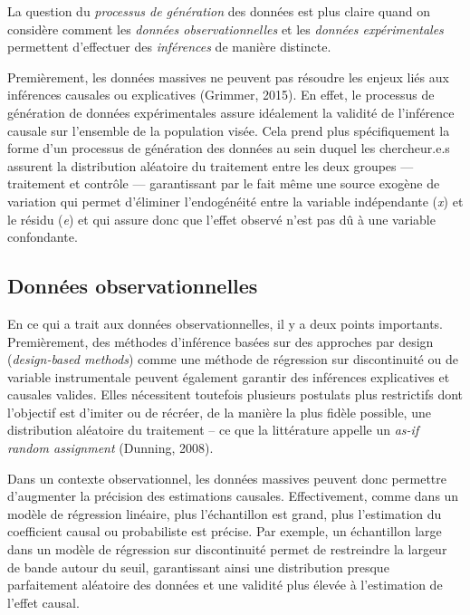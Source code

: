\documentclass[
  letterpaper,
]{scrbook}
\begin{document}
La question du \emph{processus de génération} des données est plus
claire quand on considère comment les \emph{données observationnelles}
et les \emph{données expérimentales} permettent d'effectuer des
\emph{inférences} de manière distincte.

Premièrement, les données massives ne peuvent pas résoudre les enjeux
liés aux inférences causales ou explicatives (Grimmer, 2015). En effet,
le processus de génération de données expérimentales assure idéalement
la validité de l'inférence causale sur l'ensemble de la population
visée. Cela prend plus spécifiquement la forme d'un processus de
génération des données au sein duquel les chercheur.e.s assurent la
distribution aléatoire du traitement entre les deux groupes ---
traitement et contrôle --- garantissant par le fait même une source
exogène de variation qui permet d'éliminer l'endogénéité entre la
variable indépendante (\emph{x}) et le résidu (\emph{e}) et qui assure
donc que l'effet observé n'est pas dû à une variable confondante.

\hypertarget{donnuxe9es-observationnelles}{%
\subsection{Données
observationnelles}\label{donnuxe9es-observationnelles}}

En ce qui a trait aux données observationnelles, il y a deux points
importants. Premièrement, des méthodes d'inférence basées sur des
approches par design (\emph{design-based methods}) comme une méthode de
régression sur discontinuité ou de variable instrumentale peuvent
également garantir des inférences explicatives et causales valides.
Elles nécessitent toutefois plusieurs postulats plus restrictifs dont
l'objectif est d'imiter ou de récréer, de la manière la plus fidèle
possible, une distribution aléatoire du traitement -- ce que la
littérature appelle un \emph{as-if random assignment} (Dunning, 2008).

Dans un contexte observationnel, les données massives peuvent donc
permettre d'augmenter la précision des estimations causales.
Effectivement, comme dans un modèle de régression linéaire, plus
l'échantillon est grand, plus l'estimation du coefficient causal ou
probabiliste est précise. Par exemple, un échantillon large dans un
modèle de régression sur discontinuité permet de restreindre la largeur
de bande autour du seuil, garantissant ainsi une distribution presque
parfaitement aléatoire des données et une validité plus élevée à
l'estimation de l'effet causal.
\end{document}
